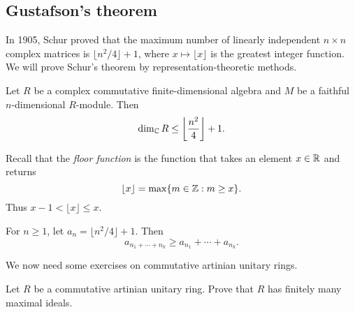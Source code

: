 

\subsection{Gustafson's theorem}

In 1905, Schur proved that the maximum number of linearly independent 
$n\times n$ complex matrices is $\lfloor n^2/4\rfloor+1$, where $x\mapsto \lfloor x\rfloor$ is the 
greatest integer function. We will prove Schur's theorem by representation-theoretic methods.

\begin{theorem}[Gustafson]
\label{thm:Gustafson}
    Let $R$ be a complex commutative finite-dimensional algebra 
    and $M$ be a faithful $n$-dimensional $R$-module. Then
    \[
    \dim_{\mathbb{C}}R\leq\left\lfloor\frac{n^2}{4}\right\rfloor+1.
    \]
\end{theorem}

Recall that the \emph{floor function} is the function that takes an element $x\in\mathbb{R}$ 
and returns 
\[
    \lfloor x\rfloor = \max\{m\in\mathbb{Z}:m\geq x\}.
\]
Thus $x-1<\lfloor x\rfloor\leq x$. 

\begin{exercise}
    \label{xca:floor}
    For $n\geq1$, let $a_n=\lfloor n^2/4\rfloor+1$. Then 
    \[
    a_{n_1+\cdots+n_k}\geq a_{n_1}+\cdots+a_{n_k}.
    \]
\end{exercise}


We now need some exercises on commutative artinian 
unitary rings.

\begin{exercise}
    Let $R$ be a commutative artinian unitary ring. 
    Prove that $R$ has finitely many maximal ideals. 
\end{exercise}

